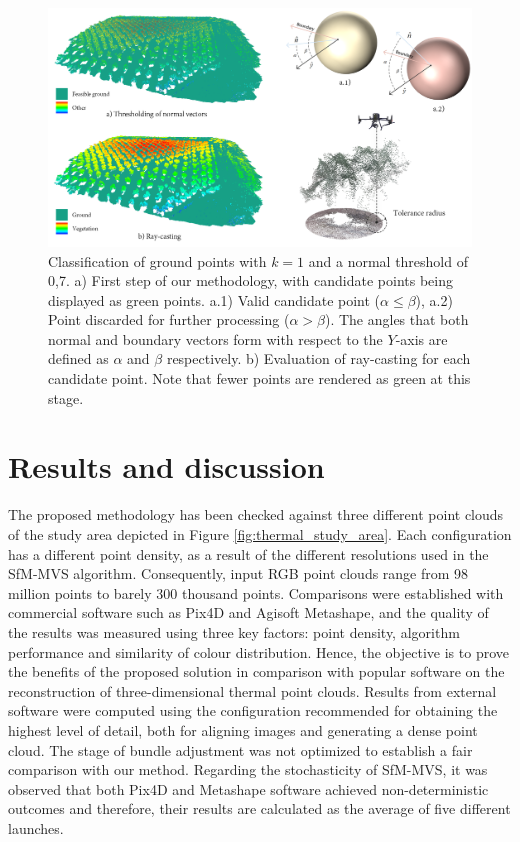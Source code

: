 \begin{figure}
    \centering
    \includegraphics{figs/thermal_projection/thermal_classification_result.png}
	\caption{Classification of ground points with $k = 1$ and a normal threshold of 0,7. a) First step of our methodology, with candidate points being displayed as green points. a.1) Valid candidate point ($\alpha \leq \beta$), a.2) Point discarded for further processing ($\alpha > \beta$). The angles that both normal and boundary vectors form with respect to the $Y$-axis are defined as $\alpha$ and $\beta$ respectively. b) Evaluation of ray-casting for each candidate point. Note that fewer points are rendered as green at this stage. }
	\label{fig:thermal_ground_classification}
\end{figure}

\section{Results and discussion}
\label{Results and discussion}

The proposed methodology has been checked against three different point clouds of the study area depicted in Figure \ref{fig:thermal_study_area}. Each configuration has a different point density, as a result of the different resolutions used in the SfM-MVS algorithm. Consequently, input RGB point clouds range from 98 million points to barely 300 thousand points. Comparisons were established with commercial software such as Pix4D and Agisoft Metashape, and the quality of the results was measured using three key factors: point density, algorithm performance and similarity of colour distribution. Hence, the objective is to prove the benefits of the proposed solution in comparison with popular software on the reconstruction of three-dimensional thermal point clouds. Results from external software were computed using the configuration recommended for obtaining the highest level of detail, both for aligning images and generating a dense point cloud. The stage of bundle adjustment was not optimized to establish a fair comparison with our method. Regarding the stochasticity of SfM-MVS, it was observed that both Pix4D and Metashape software achieved non-deterministic outcomes and therefore, their results are calculated as the average of five different launches.

